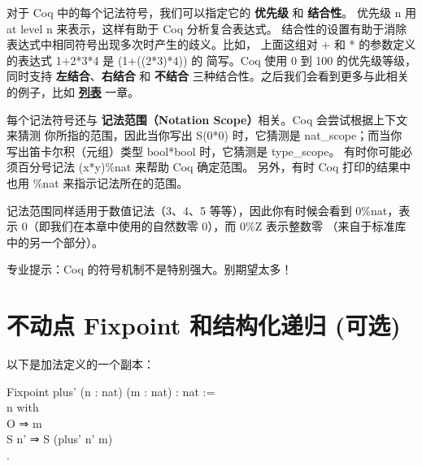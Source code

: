 \documentclass[utf8]{ctexart}
\begin{document}
对于 Coq 中的每个记法符号，我们可以指定它的 \textbf{优先级} 和
\textbf{结合性}。 优先级 {{n}} 用 {{at}} {{level}} {{n}}
来表示，这样有助于 Coq 分析复合表达式。
结合性的设置有助于消除表达式中相同符号出现多次时产生的歧义。比如，
上面这组对 {+} 和 {*} 的参数定义的表达式 {1+2*3*4} 是 {(1+((2*3)*4))} 的
简写。Coq 使用 0 到 100 的优先级等级，同时支持
\textbf{左结合}、\textbf{右结合} 和 \textbf{不结合}
三种结合性。之后我们会看到更多与此相关的例子，比如
\href{Lists.html}{\textbf{列表}} 一章。

每个记法符号还与 \textbf{记法范围（Notation Scope）}相关。Coq
会尝试根据上下文来猜测 你所指的范围，因此当你写出 {{S}(0*0)}
时，它猜测是 {{nat\_scope}}；而当你 写出笛卡尔积（元组）类型
{{bool}*{bool}} 时，它猜测是 {{type\_scope}}。 有时你可能必须百分号记法
{({x}*{y})\%{nat}} 来帮助 Coq 确定范围。 另外，有时 Coq 打印的结果中也用
{\%{nat}} 来指示记法所在的范围。

记法范围同样适用于数值记法（{3}、{4}、{5} 等等），因此你有时候会看到
{0\%{nat}}，表示 {0}（即我们在本章中使用的自然数零 {0}），而 {0\%{Z}}
表示整数零 （来自于标准库中的另一个部分）。

专业提示：Coq 的符号机制不是特别强大。别期望太多！

\protect\hypertarget{lab41}{}{}

\hypertarget{ux4e0dux52a8ux70b9-fixpoint-ux548cux7ed3ux6784ux5316ux9012ux5f52-ux53efux9009}{%
\section{\texorpdfstring{不动点 {{Fixpoint}} 和结构化递归
(可选)}{不动点 Fixpoint 和结构化递归 (可选)}}\label{ux4e0dux52a8ux70b9-fixpoint-ux548cux7ed3ux6784ux5316ux9012ux5f52-ux53efux9009}}

以下是加法定义的一个副本：

{Fixpoint} {plus'} ({n} : {nat}) ({m} : {nat}) : {nat} :=\\
\hspace*{0.333em}\hspace*{0.333em}{match} {n} {with}\\
\hspace*{0.333em}\hspace*{0.333em}\textbar{} {O} ⇒ {m}\\
\hspace*{0.333em}\hspace*{0.333em}\textbar{} {S} {n'} ⇒ {S} ({plus'}
{n'} {m})\\
\hspace*{0.333em}\hspace*{0.333em}{end}.\\
\end{document}
